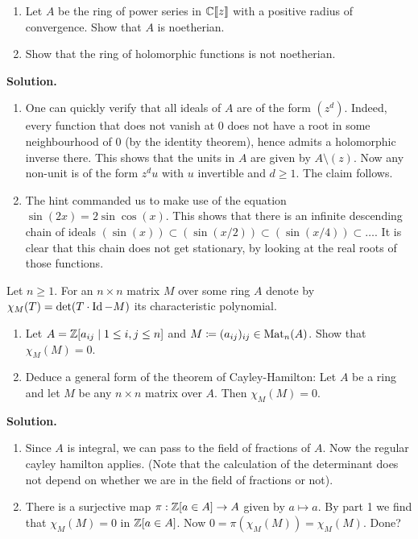 \documentclass[a4paper,11pt]{article}
\begin{document}
\begin{enumerate}
    \item Let $A$ be the ring of power series in $\mathbb{C}\llbracket z \rrbracket$ with
        a positive radius of convergence. Show that $A$ is noetherian.
    \item Show that the ring of holomorphic functions is not noetherian. 
\end{enumerate}

\textbf{Solution.}
\begin{enumerate}
\item One can quickly verify that all ideals of $A$ are of the form 
    $(z^d)$. Indeed, every function that does not vanish at $0$ does not have 
    a root in some neighbourhood of $0$ (by the identity theorem), hence admits
    a holomorphic inverse there. This shows that the units in $A$ are given by
    $A \setminus (z)$. Now any non-unit is of the form $z^d u$ with $u$ invertible
    and $d \geq 1$. The claim follows. 

\item The hint commanded us to make use of the equation 
    $\sin(2x) = 2 \sin \cos(x)$. This shows that there is an infinite
    descending chain of ideals $(\sin(x)) \subset (\sin(x/2)) \subset (\sin(x/4))
    \subset \dots$. It is clear that this chain does not get stationary, by 
    looking at the real roots of those functions. 
\end{enumerate}


Let $n \geq 1$. For an $n \times n$ matrix $M$ over some ring $A$ denote by 
$\chi_M(T) = \det( T \cdot \operatorname{Id} - M)$ its characteristic polynomial.
\begin{enumerate}
    \item Let $A = \mathbb{Z}[a_{ij} \mid 1 \leq i,j \leq n]$ and $M \coloneqq (a_{ij})_{ij}
        \in \operatorname{Mat}_n(A)$. Show that $\chi_M(M) = 0$. 
    \item Deduce a general form of the theorem of Cayley-Hamilton: Let $A$ be a ring
        and let $M$ be any $n \times n$ matrix over $A$. Then $\chi_M(M) = 0$. 
\end{enumerate}
\textbf{Solution.}
\begin{enumerate}
    \item Since $A$ is integral, we can pass to the field of fractions of $A$. 
        Now the regular cayley hamilton applies. (Note that the calculation of 
        the determinant does not depend on whether we are in the field of 
        fractions or not).
    \item There is a surjective map $\pi: \mathbb{Z}[a \in A] \to A$ given by 
        $a \mapsto a$. By part 1 we find that $\chi_M(M)=0$ in $\mathbb{Z}[a \in A]$. 
        Now $0 = \pi(\chi_M(M)) = \chi_M(M)$. Done?
\end{enumerate}
\end{document}
